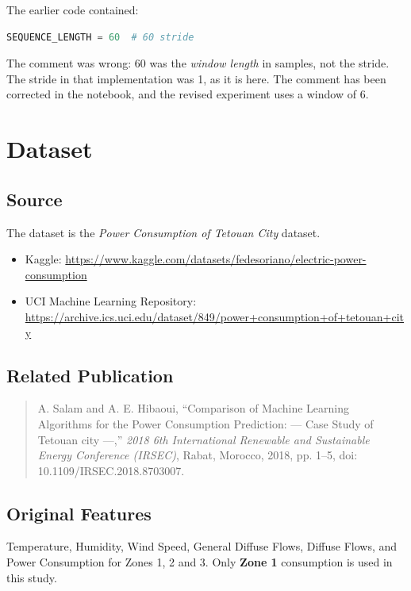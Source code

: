 \documentclass[11pt,a4paper]{article}
\begin{document}
The earlier code contained:

\begin{lstlisting}[language=Python]
SEQUENCE_LENGTH = 60  # 60 stride
\end{lstlisting}

\noindent
The comment was wrong: 60 was the \emph{window length} in samples, not the stride. The stride in
that implementation was 1, as it is here. The comment has been corrected in the notebook, and the
revised experiment uses a window of 6.


\section{Dataset}

\subsection{Source}

The dataset is the \emph{Power Consumption of Tetouan City} dataset.

\begin{itemize}
  \item Kaggle: \url{https://www.kaggle.com/datasets/fedesoriano/electric-power-consumption}
  \item UCI Machine Learning Repository:
        \url{https://archive.ics.uci.edu/dataset/849/power+consumption+of+tetouan+city}
\end{itemize}

\subsection{Related Publication}

\begin{quote}
A. Salam and A. E. Hibaoui, ``Comparison of Machine Learning Algorithms for the Power
Consumption Prediction: --- Case Study of Tetouan city ---,'' \emph{2018 6th International
Renewable and Sustainable Energy Conference (IRSEC)}, Rabat, Morocco, 2018, pp. 1--5,
doi: 10.1109/IRSEC.2018.8703007.
\end{quote}

\subsection{Original Features}

Temperature, Humidity, Wind Speed, General Diffuse Flows, Diffuse Flows, and Power Consumption for
Zones 1, 2 and 3. Only \textbf{Zone 1} consumption is used in this study.
\end{document}
